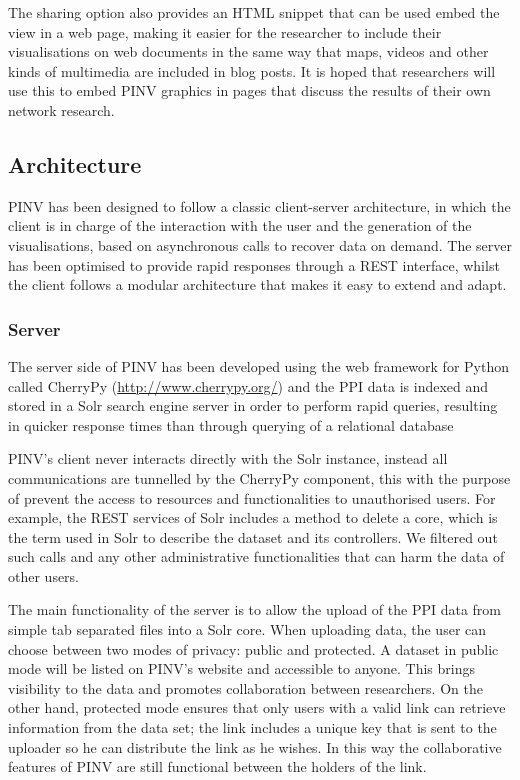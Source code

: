The sharing option also provides an HTML snippet that can be used embed the view in a web page, making it easier for the researcher to include their visualisations on web documents in the same way that maps, videos and other kinds of multimedia are included in blog posts. It is hoped that researchers will use this to embed PINV graphics in pages that discuss the results of their own network research.



\subsection{Architecture} \label{pinv_architecture}
PINV has been designed to follow a classic client-server architecture, in which the client is in charge of the interaction with the user and the generation of the visualisations, based on asynchronous calls to recover data on demand. The server has been optimised to provide rapid responses through a REST interface, whilst the client follows a modular architecture that makes it easy to extend and adapt. 


\subsubsection{Server}
The server side of PINV has been developed using the web framework for Python called CherryPy (\url{http://www.cherrypy.org/}) and the PPI data is indexed and stored in a Solr search engine server \cite{KUC2013} in order to perform rapid queries, resulting in quicker response times than through querying of a relational database

PINV's client never interacts directly with the Solr instance, instead all communications are tunnelled by the CherryPy component, this with the purpose of prevent the access to resources and functionalities to unauthorised users. For example, the REST services of Solr includes a method to delete a core, which is the term used in Solr to describe the dataset and its controllers. We filtered out such calls and any other administrative functionalities that can harm the data of other users.

The main functionality of the server is to allow the upload of the PPI data from simple tab separated files into a Solr core. When uploading data, the user can choose between two modes of privacy: public and protected. A dataset in public mode will be listed on PINV’s website and accessible to anyone. This brings visibility to the data and promotes collaboration between researchers. On the other hand, protected mode ensures that only users with a valid link can retrieve information from the data set; the link includes a unique key that is sent to the uploader so he can distribute the link as he wishes. In this way the collaborative features of PINV are still functional between the holders of the link.


